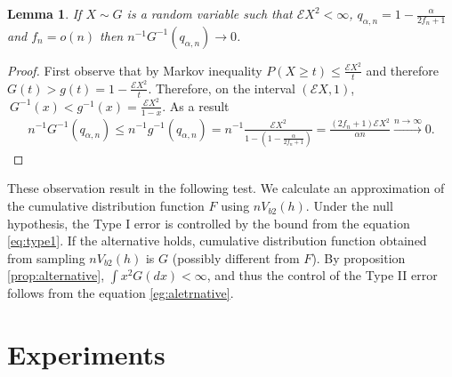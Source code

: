 \documentclass{article} %
\newtheorem{lemma}{Lemma}
\newcommand{\ev}{\mathcal{E}}
\begin{document}
\begin{lemma}
\label{lem:FoverN}
If $X \sim G$ is a random variable such that $\ev X^2 <\infty$, $q_{\alpha,n} = 1-\frac{\alpha}{2f_n+1}$ and $f_n=o(n)$ then $n^{-1} G^{-1}(q_{\alpha,n}) \to 0$.
\end{lemma}  
\begin{proof}
 First observe that by Markov inequality $P(X \geq t) \leq \frac {\ev X^2} {t} $ and therefore $G(t) > g(t) = 1 - \frac {\ev X^2} {t}$.  Therefore, on the interval   $(\ev X,1)$,  $ \ G^{-1}(x) < g^{-1}(x) = \frac{\ev X^2}{1-x}$. As a result 
 \begin{align}
 \label{eg:aletrnative}
 n^{-1} G^{-1}(q_{\alpha,n})  \leq  n^{-1} g^{-1}(q_{\alpha,n})  =n^{-1}  \frac{\ev X^2} { 1 - (1 -\frac {\alpha} {2f_n+1})}= \frac{(2f_n+1) \ev X^2  }{\alpha n} \overset{n \to \infty}{\longrightarrow} 0.
 \end{align} 
\end{proof}
These observation result in the following test. We calculate an approximation of the cumulative distribution function $F$ using $nV_{b2}(h)$. Under the null hypothesis, the Type I error is controlled by the bound from the equation \eqref{eq:type1}. If the alternative holds, cumulative distribution function obtained from sampling $nV_{b2}(h)$ is $G$ (possibly different from $F$). By proposition \ref{prop:alternative}, $\int x^2 G(dx) < \infty$, and thus the control of the Type II error follows from the equation \ref{eg:aletrnative}. 

\section{Experiments}
\label{sec:Experiments}
\end{document}

